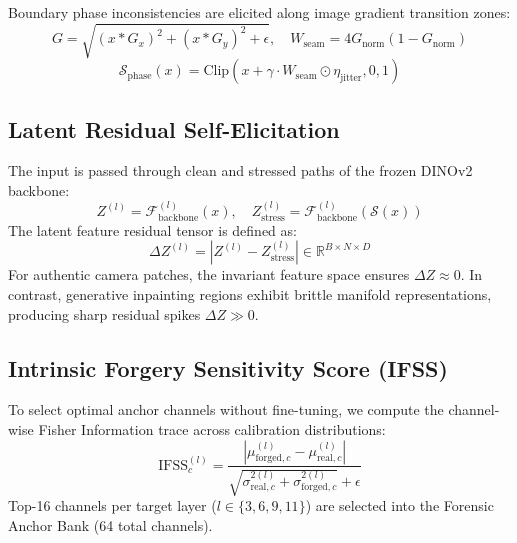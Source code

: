 \documentclass[10pt,journal,compsoc]{IEEEtran}
\begin{document}
Boundary phase inconsistencies are elicited along image gradient transition zones:
\begin{equation}
    G = \sqrt{(x * G_x)^2 + (x * G_y)^2 + \epsilon}, \quad W_{\text{seam}} = 4 G_{\text{norm}}(1 - G_{\text{norm}})
\end{equation}
\begin{equation}
    \mathcal{S}_{\text{phase}}(x) = \text{Clip}\left(x + \gamma \cdot W_{\text{seam}} \odot \eta_{\text{jitter}}, 0, 1\right)
\end{equation}

\subsection{Latent Residual Self-Elicitation}
The input is passed through clean and stressed paths of the frozen DINOv2 backbone:
\begin{equation}
    Z^{(l)} = \mathcal{F}_{\text{backbone}}^{(l)}(x), \quad Z_{\text{stress}}^{(l)} = \mathcal{F}_{\text{backbone}}^{(l)}(\mathcal{S}(x))
\end{equation}
The latent feature residual tensor is defined as:
\begin{equation}
    \Delta Z^{(l)} = \left| Z^{(l)} - Z_{\text{stress}}^{(l)} \right| \in \mathbb{R}^{B \times N \times D}
\end{equation}
For authentic camera patches, the invariant feature space ensures $\Delta Z \approx 0$. In contrast, generative inpainting regions exhibit brittle manifold representations, producing sharp residual spikes $\Delta Z \gg 0$.

\subsection{Intrinsic Forgery Sensitivity Score (IFSS)}
To select optimal anchor channels without fine-tuning, we compute the channel-wise Fisher Information trace across calibration distributions:
\begin{equation}
    \text{IFSS}_c^{(l)} = \frac{\left| \mu_{\text{forged}, c}^{(l)} - \mu_{\text{real}, c}^{(l)} \right|}{\sqrt{\sigma_{\text{real}, c}^{2(l)} + \sigma_{\text{forged}, c}^{2(l)}} + \epsilon}
\end{equation}
Top-16 channels per target layer ($l \in \{3, 6, 9, 11\}$) are selected into the Forensic Anchor Bank (64 total channels).
\end{document}
